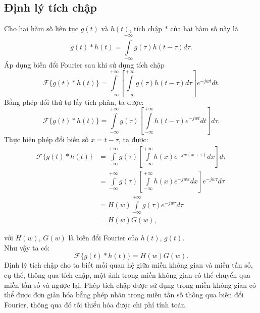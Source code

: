 \subsection{Định lý tích chập}
Cho hai hàm số liên tục $g(t)$ và $h(t)$, tích chập $*$ của hai hàm số này là
$$g(t)*h(t) = \int\limits_{ - \infty }^{ + \infty } {g(\tau )h(t - \tau )} d\tau .
$$
Áp dụng biến đổi Fourier sau khi sử dụng tích chập
$$\mathcal{F} \{g(t) * h(t)\} = \int\limits_{- \infty }^{ + \infty } \left[ \int\limits_{- \infty}^{+ \infty } g(\tau )h(t - \tau )d\tau  \right] e^{-jwt} dt.$$
Bằng phép đổi thứ tự lấy tích phân, ta được:
$$\mathcal{F} \{g(t) * h(t)\} = \int\limits_{ - \infty }^{ + \infty } {g(\tau ) \left[ \int\limits_{ - \infty }^{ + \infty } {h(t - \tau ) e^{-jwt}} dt \right] d\tau }.$$
Thực hiện phép đổi biến số $x=t-\tau$, ta được:
\begin{align*}
	\mathcal{F} \{g(t) * h(t)\} & =  \int\limits_{ - \infty }^{ + \infty } {g(\tau ) \left[ \int\limits_{ - \infty }^{ + \infty } {h(x) e^{ - j w(x + \tau ) } dx} \right] d\tau } \\
	& = \int\limits_{ - \infty }^{ + \infty } g(\tau ) \left[ \int\limits_{ - \infty }^{ + \infty } h(x)e^{ - jwx} dx \right] {{e}^{ - j w \tau }} d \tau \\
	& = H(w) \int\limits_{ - \infty }^{ + \infty } g(\tau ) { e^{ - jw \tau }}d\tau \\
	& = H(w)G(w),
\end{align*}

với $H(w)$, $G(w)$ là biến đổi Fourier của $h(t)$, $g(t)$.\\
Như vậy ta có:
$$\mathcal{F} \{g(t) * h(t)\} = H(w)G(w).$$
Định lý tích chập cho ta biết mối quan hệ giữa miền không gian và miền tần số, cụ thể, thông qua tích chập, một ảnh trong miền không gian có thể chuyển qua miền tần số và ngược lại. Phép tích chập được sử dụng trong miền không gian có thể được đơn giản hóa bằng phép nhân trong miền tần số thông qua biến đổi Fourier, thông qua đó tối thiểu hóa được chi phí tính toán. 
